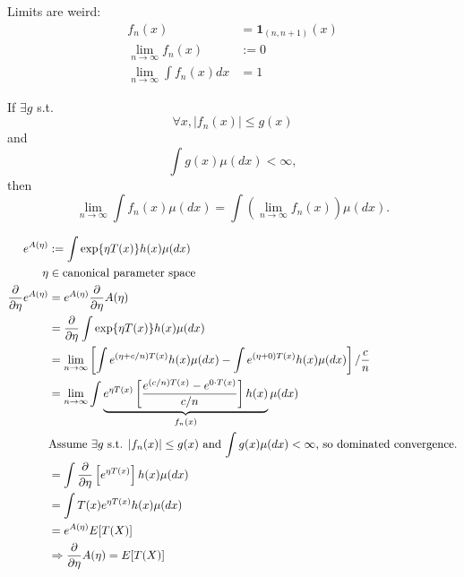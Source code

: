 \documentclass[twoside]{article}
\begin{document}
Limits are weird:
\begin{align*}
  f_n(x) &= \mathbf{1}_{(n, n+1)}(x) \\
  \lim_{n \rightarrow \infty} f_n(x) &:= 0 \\
  \lim_{n \rightarrow \infty} \int f_n(x) dx &= 1
\end{align*}

\begin{theorem}
  If $\exists g$ s.t. \[\forall x, |f_n(x)| \le g(x)\] and \[\int g(x) \mu(dx) <
  \infty,\] then \[\lim_{n \rightarrow \infty} \int f_n(x) \mu(dx) = \int
  \left(\lim_{n \rightarrow \infty} f_n(x) \right) \mu(dx).\]
\end{theorem}

\begin{example}
\begin{align*}
  e^{A(\eta)} &:= \int \exp\{\eta T(x) \} h(x) \mu(dx) \\
  \eta &\in \text{canonical parameter space} \\
  \frac{\partial}{\partial \eta} e^{A(\eta)} &= e^{A(\eta)}
  \frac{\partial}{\partial \eta}A(\eta) \\
  &= \frac{\partial}{\partial \eta} \int \exp\{\eta T(x) \} h(x) \mu(dx)\\
  &= \lim_{n \rightarrow \infty} \left[ \int e^{(\eta + c/n)T(x)} h(x) \mu(dx) -
  \int e^{(\eta + 0)T(x)} h(x) \mu(dx) \right]/ \frac{c}{n} \\
  &= \lim_{n \rightarrow \infty} \int \underbrace{e^{\eta T(x)} \left[
  \frac{e^{(c/n)T(x)} - e^{0 \cdot T(x)}}{c/n} \right] h(x)}_{f_n(x)} \mu(dx) \\
  & \text{Assume $\exists g$ s.t. $|f_n(x)| \le g(x)$ and $\int g(x) \mu(dx) <
  \infty$, so dominated convergence.} \\
  &= \int \frac{\partial}{\partial \eta} \left[e^{\eta T(x)}\right] h(x) \mu(dx) \\
  &= \int T(x) e^{\eta T(x)} h(x) \mu(dx)  \\
  &= e^{A(\eta)} E[T(X)] \\
  &\Rightarrow \frac{\partial}{\partial \eta} A(\eta) = E[T(X)]
\end{align*}
\end{example}




\end{document}
